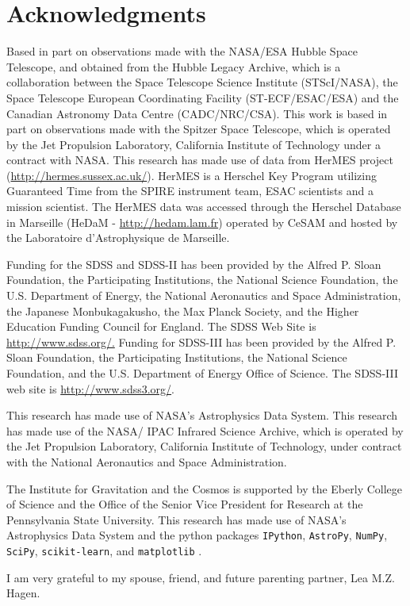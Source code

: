 \documentclass[preprint,natbib209]{aastex}
\begin{document}
\acknowledgments
\section*{Acknowledgments}
Based in part on observations made with the NASA/ESA Hubble Space Telescope, 
and obtained from the Hubble Legacy Archive, which is a collaboration between
the Space Telescope Science Institute (STScI/NASA), the Space Telescope 
European Coordinating Facility (ST-ECF/ESAC/ESA) and the 
Canadian Astronomy Data Centre (CADC/NRC/CSA). 
This work is based in part on observations made with the Spitzer Space Telescope, 
which is operated by the Jet Propulsion Laboratory, California Institute of Technology under a contract with NASA.
This research has made use of data from HerMES project (\url{http://hermes.sussex.ac.uk/}). 
HerMES is a Herschel Key Program utilizing Guaranteed Time from the SPIRE instrument team,
ESAC scientists and a mission scientist.
The HerMES data was accessed through the Herschel Database in 
Marseille (HeDaM - \url{http://hedam.lam.fr}) operated by CeSAM and
hosted by the Laboratoire d'Astrophysique de Marseille.

Funding for the SDSS and SDSS-II has been provided by the Alfred P. Sloan Foundation, 
the Participating Institutions, the National Science Foundation, the U.S. Department of Energy, 
the National Aeronautics and Space Administration, the Japanese Monbukagakusho, 
the Max Planck Society, and the Higher Education Funding Council for England. 
The SDSS Web Site is \url{http://www.sdss.org/.}
Funding for SDSS-III has been provided by the Alfred P. Sloan Foundation, the Participating Institutions, 
the National Science Foundation, and the U.S. Department of Energy Office of Science. 
The SDSS-III web site is \url{http://www.sdss3.org/}.

This research has made use of NASA's Astrophysics Data System.
This research has made use of the NASA/ IPAC Infrared Science Archive, 
which is operated by the Jet Propulsion Laboratory, California Institute of Technology, 
under contract with the National Aeronautics and Space Administration.

The Institute for Gravitation and the Cosmos is 
supported by the Eberly College of Science and the Office of the Senior Vice
President for Research at the Pennsylvania 
State University. This research has made use of NASA's Astrophysics Data System 
and the python packages \texttt{IPython}, \texttt{AstroPy}, 
\texttt{NumPy}, \texttt{SciPy}, \texttt{scikit-learn}, and \texttt{matplotlib}
 \citep{ipython, astropy, numpy, scipy, scikit-learn, matplotlib}.

I am very grateful to my spouse, friend, and future parenting partner, Lea M.Z. Hagen.


\end{document}
